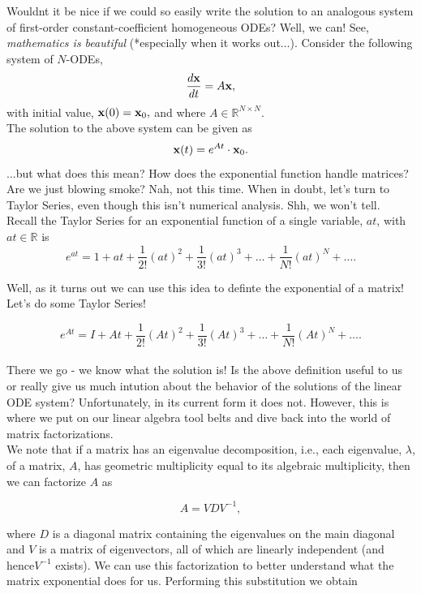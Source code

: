 Wouldnt it be nice if we could so easily write the solution to an analogous system of first-order constant-coefficient homogeneous ODEs? Well, we can! See, \emph{mathematics is beautiful} (*especially when it works out...). Consider the following system of $N$-ODEs, 
$$\frac{ d{\bf{x}} }{dt} = A {\bf{x}},$$ with initial value, ${\bf{x}}(0) = {\bf{x}}_0,$ and where $A\in\mathbb{R}^{N
\times N}. $\\

The solution to the above system can be given as $${\bf{x}}(t) = e^{At}\cdot {\bf{x}}_0.$$
%
...but what does this mean? How does the exponential function handle matrices? Are we just blowing smoke? Nah, not this time. When in doubt, let's turn to Taylor Series, even though this isn't numerical analysis. Shh, we won't tell. \\

Recall the Taylor Series for an exponential function of a single variable, $at$, with $at\in\mathbb{R}$  is
$$e^{at} = 1 + at + \frac{1}{2!} (at)^2 + \frac{1}{3!} (at)^3 + \ldots + \frac{1}{N!} (at)^N + \ldots .$$

Well, as it turns out we can use this idea to definte the exponential of  a matrix! Let's do some Taylor Series!

$$e^{At} = I + At+ \frac{1}{2!} (At)^2 + \frac{1}{3!} (At)^3 + \ldots + \frac{1}{N!} (At)^N + \ldots .$$\\

There we go - we know what the solution is! Is the above definition useful to us or really give us much intution about the behavior of the solutions of the linear ODE system? Unfortunately, in its current form it does not. However, this is where we put on our linear algebra tool belts and dive back into the world of matrix factorizations. \\

We note that if a matrix has an eigenvalue decomposition, i.e., each eigenvalue, $\lambda$, of a matrix, $A$, has geometric multiplicity equal to its algebraic multiplicity, then we can factorize $A$ as 

$$A = VDV^{-1},$$

where $D$ is a diagonal matrix containing the eigenvalues on the main diagonal and $V$ is a matrix of eigenvectors, all of which are linearly independent (and hence$V^{-1}$ exists). We can use this factorization to better understand what the matrix exponential does for us. Performing this substitution we obtain

